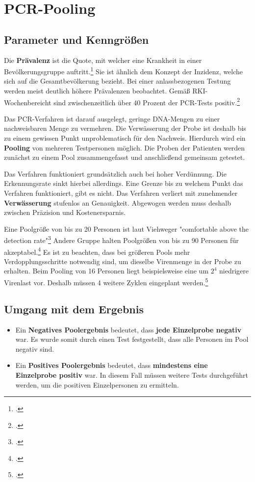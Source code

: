 \cleardoublepage
\chapter{PCR-Pooling}
\section{Parameter und Kenngrößen}

Die \textbf{Prävalenz} ist die Quote, mit welcher eine Krankheit in einer Bevölkerungsgruppe auftritt.\footcite{gordis_epidemiologie_2001}%
Sie ist ähnlich dem Konzept der Inzidenz, welche sich auf die Gesamtbevölkerung bezieht.
Bei einer anlassbezogenen Testung werden meist deutlich höhere Prävalenzen beobachtet.
Gemäß RKI-Wochenbereicht sind zwischenzeitlich über 40 Prozent der PCR-Tests positiv.\footcite{noauthor_rki-bericht_2021}

Das PCR-Verfahren ist darauf ausgelegt, geringe DNA-Mengen zu einer nachweisbaren Menge zu vermehren.
Die Verwässerung der Probe ist deshalb bis zu einem gewissen Punkt unproblematisch für den Nachweis.
Hierdurch wird ein \textbf{Pooling} von mehreren Testpersonen möglich.
Die Proben der Patienten werden zunächst zu einem Pool zusammengefasst und anschließend gemeinsam getestet.

Das Verfahren funktioniert grundsätzlich auch bei hoher Verdünnung.
Die Erkennungsrate sinkt hierbei allerdings.
Eine Grenze bis zu welchem Punkt das Verfahren funktioniert, gibt es nicht.
Das Verfahren verliert mit zunehmender \textbf{Verwässerung} stufenlos an Genauigkeit.
Abgewogen werden muss deshalb zwischen Präzision und Kostenersparnis.

Eine Poolgröße von bis zu 20 Personen ist laut Viehweger "comfortable above the detection rate"\footcite{viehweger_increased_2020}
Andere Gruppe halten Poolgrößen von bis zu 90 Personen für akzeptabel.\footcite{verwilt_evaluation_2021}
Es ist zu beachten, dass bei größeren Pools mehr Verdopplungsschritte notwendig sind, um dieselbe Virenmenge in der Probe zu erhalten.
Beim Pooling von 16 Personen liegt beispielsweise eine um $2^{4}$ niedrigere Virenlast vor.
Deshalb müssen 4 weitere Zyklen eingeplant werden.\footcite{viehweger_increased_2020}

\cleardoublepage

\section{Umgang mit dem Ergebnis}
\begin{itemize}
	\item Ein \textbf{Negatives Poolergebnis}
	bedeutet, dass \textbf{jede Einzelprobe negativ} war.
	Es wurde somit durch einen Test festgestellt, dass alle Personen im Pool negativ sind.
	
	\item Ein \textbf{Positives Poolergebnis} bedeutet, dass \textbf{mindestens eine Einzelprobe positiv} war.
	In diesem Fall müssen weitere Tests durchgeführt werden, um die positiven Einzelpersonen zu ermitteln.
\end{itemize}

